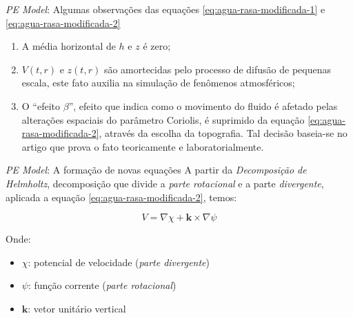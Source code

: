 \begin{frame}{\textit{PE Model}: Algumas observações das equações \eqref{eq:agua-rasa-modificada-1} e \eqref{eq:agua-rasa-modificada-2}}
	\begin{enumerate}
		\item A média horizontal de $h$ e $z$ é zero;
		\item $V(t,r)$ e $z(t,r)$ são amortecidas pelo processo de difusão de pequenas escala, este fato auxilia na simulação de fenômenos atmosféricos;
		\item O ``efeito $\beta$'', efeito que indica como o movimento do fluido é afetado pelas alterações espaciais do parâmetro Coriolis, é suprimido da equação \eqref{eq:agua-rasa-modificada-2}, através da escolha da topografia. Tal decisão baseia-se no artigo \cite{von_arx1952} que prova o fato teoricamente e laboratorialmente. 
	\end{enumerate}
\end{frame}



\begin{frame}{\textit{PE Model}: A formação de novas equações}
	A partir da \textit{Decomposição de Helmholtz}, decomposição que divide a \textit{parte rotacional} e a parte \textit{divergente}, aplicada a equação \eqref{eq:agua-rasa-modificada-2}, temos:
	
	\begin{equation}
		V = \nabla\chi + \mathbf{k} \times \nabla \psi \label{eq:decomposicao-helmholtz}
	\end{equation}
	
	Onde:
	\begin{itemize}
		\item $\chi$: potencial de velocidade (\textit{parte divergente})
		\item $\psi$: função corrente (\textit{parte rotacional})
		\item $\mathbf{k}$: vetor unitário vertical
	\end{itemize}
\end{frame}


